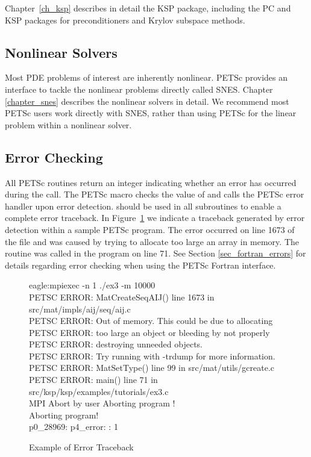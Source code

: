 Chapter~\ref{ch_ksp} describes in detail the KSP package, including
the PC and KSP packages for preconditioners and Krylov subspace methods.

\subsection*{Nonlinear Solvers}
Most PDE problems of interest are inherently nonlinear. PETSc provides 
an interface to tackle the nonlinear problems directly called SNES. Chapter
\ref{chapter_snes} describes the nonlinear solvers in detail. We recommend 
most PETSc users work directly with SNES, rather than using PETSc
for the linear problem within a nonlinear solver.

\subsection*{Error Checking}

All PETSc routines return an integer indicating whether an error
has occurred during the call.  The PETSc macro 
checks the value of  and calls the PETSc error handler
upon error detection.   should be used in all
subroutines to enable a complete error traceback.
In Figure~\ref{fig_traceback} we indicate a
traceback generated by error detection within a sample PETSc
program. The error occurred on line 1673 of the file  and was caused by trying to allocate too
large an array in memory. The routine was called in the program 
 on line 71.  See Section \ref{sec_fortran_errors} for
details regarding error checking when using the PETSc Fortran interface.

\begin{figure}[H]
\begin{tabbing}
   eagle:mpiexec -n 1 ./ex3 -m 10000\\
   PETSC ERROR: MatCreateSeqAIJ() line 1673 in src/mat/impls/aij/seq/aij.c\\
   PETSC ERROR:   Out of memory. This could be due to allocating\\
   PETSC ERROR:   too large an object or bleeding by not properly\\
   PETSC ERROR:   destroying unneeded objects.\\
   PETSC ERROR:   Try running with -trdump for more information.\\ 
   PETSC ERROR: MatSetType() line 99 in src/mat/utils/gcreate.c  \\
   PETSC ERROR: main() line 71 in src/ksp/ksp/examples/tutorials/ex3.c\\  
   MPI Abort by user Aborting program !\\
   Aborting program! \\
   p0\_28969:  p4\_error: : 1
\end{tabbing}
\nobreak
\caption{Example of Error Traceback}
\label{fig_traceback}
\end{figure}

